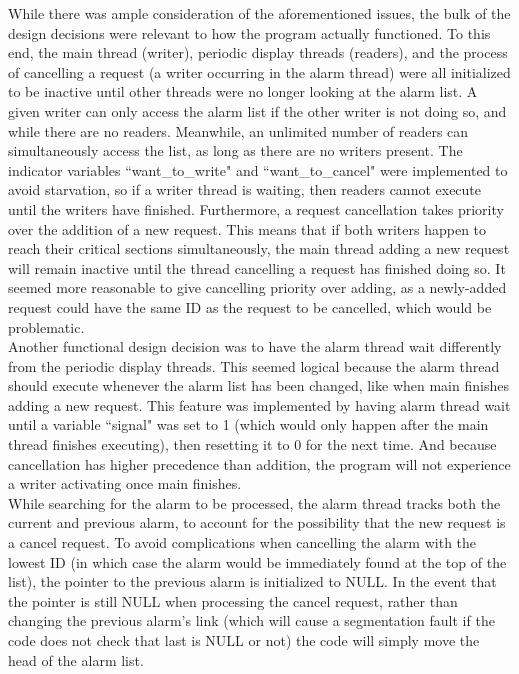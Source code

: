 \documentclass[11pt]{article}
\begin{document}
	While there was ample consideration of the aforementioned issues, the bulk of the design decisions were relevant to how the program actually functioned. To this end, the main thread (writer), periodic display threads (readers), and the process of cancelling a request (a writer occurring in the alarm thread) were all initialized to be inactive until other threads were no longer looking at the alarm list. A given writer can only access the alarm list if the other writer is not doing so, and while there are no readers. Meanwhile, an unlimited number of readers can simultaneously access the list, as long as there are no writers present. The indicator variables ``want\_to\_write" and ``want\_to\_cancel" were implemented to avoid starvation, so if a writer thread is waiting, then readers cannot execute until the writers have finished. Furthermore, a request cancellation takes priority over the addition of a new request. This means that if both writers happen to reach their critical sections simultaneously, the main thread adding a new request will remain inactive until the thread cancelling a request has finished doing so. It seemed more reasonable to give cancelling priority over adding, as a newly-added request could have the same ID as the request to be cancelled, which would be problematic. \\

	Another functional design decision was to have the alarm thread wait differently from the periodic display threads. This seemed logical because the alarm thread should execute whenever the alarm list has been changed, like when main finishes adding a new request. This feature was implemented by having alarm thread wait until a variable ``signal" was set to 1 (which would only happen after the main thread finishes executing), then resetting it to 0 for the next time. And because cancellation has higher precedence than addition, the program will not experience a writer activating once main finishes. \\

	While searching for the alarm to be processed, the alarm thread tracks both the current and previous alarm, to account for the possibility that the new request is a cancel request. To avoid complications when cancelling the alarm with the lowest ID (in which case the alarm would be immediately found at the top of the list), the pointer to the previous alarm is initialized to NULL. In the event that the pointer is still NULL when processing the cancel request, rather than changing the previous alarm's link (which will cause a segmentation fault if the code does not check that last is NULL or not) the code will simply move the head of the alarm list.\\
\end{document}
